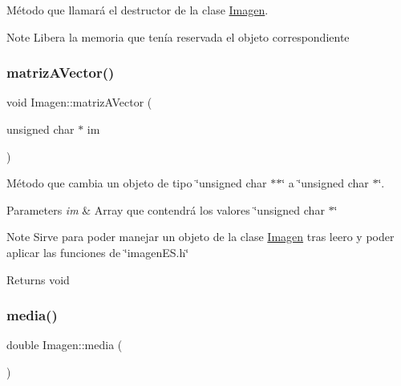 Método que llamará el destructor de la clase \hyperlink{classImagen}{Imagen}. 

\begin{DoxyNote}{Note}
Libera la memoria que tenía reservada el objeto correspondiente 
\end{DoxyNote}
\mbox{\label{classImagen_a2c9361edc4ffbd541c8073f900a0195d}} 
\subsubsection{\texorpdfstring{matriz\+A\+Vector()}{matrizAVector()}}
{\footnotesize\ttfamily void Imagen\+::matriz\+A\+Vector (\begin{DoxyParamCaption}\item[{unsigned char $\ast$}]{im }\end{DoxyParamCaption})}



Método que cambia un objeto de tipo \char`\"{}unsigned char $\ast$$\ast$\char`\"{} a \char`\"{}unsigned char $\ast$\char`\"{}. 


\begin{DoxyParams}{Parameters}
{\em im} & Array que contendrá los valores \char`\"{}unsigned char $\ast$\char`\"{} \\
\hline
\end{DoxyParams}
\begin{DoxyNote}{Note}
Sirve para poder manejar un objeto de la clase \hyperlink{classImagen}{Imagen} tras leero y poder aplicar las funciones de \char`\"{}imagen\+E\+S.\+h\char`\"{} 
\end{DoxyNote}
\begin{DoxyReturn}{Returns}
void 
\end{DoxyReturn}
\mbox{\label{classImagen_a6e645bb64264a8e029673d364ae1f838}} 
\subsubsection{\texorpdfstring{media()}{media()}}
{\footnotesize\ttfamily double Imagen\+::media (\begin{DoxyParamCaption}{ }\end{DoxyParamCaption})}



